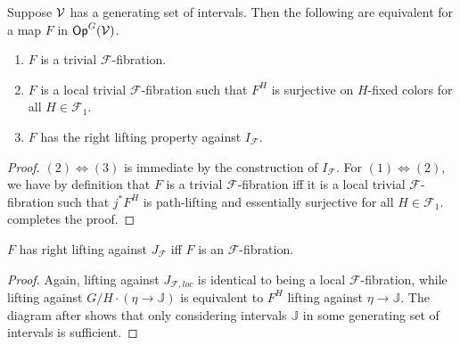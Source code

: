 \documentclass[a4paper,10pt
,draft
]{article}%
\renewcommand{\F}{\mathcal F}
\newcommand{\J}{\mathbb J}
\renewcommand{\1}{\eta}%
\begin{document}
\begin{lemma}
      \label{CAV_4.8}
      Suppose $\mathcal V$ has a generating set of intervals.
      Then the following are equivalent for a map $F$ in $\mathsf{Op}^G(\mathcal V)$.
      \begin{enumerate}[label = (\arabic*)]
      \item $F$ is a trivial $\F$-fibration.
      \item $F$ is a local trivial $\F$-fibration such that $F^H$ is surjective on $H$-fixed colors for all $H \in \F_1$.
      \item $F$ has the right lifting property against $I_{\F}$.
      \end{enumerate}
\end{lemma}
\begin{proof}
      $(2) \Leftrightarrow (3)$ is immediate by the construction of $I_{\F}$.
      For $(1) \Leftrightarrow (2)$, we have by definition that
      $F$ is a trivial $\F$-fibration
      iff
      it is a local trivial $\F$-fibration such that $j^*F^H$ is path-lifting and essentially surjective for all $H \in \F_1$.
      \cite[2.4]{BM13} completes the proof. 
\end{proof}

\begin{lemma}
      $F$ has right lifting against $J_{\F}$ iff $F$ is an $\F$-fibration.
\end{lemma}
\begin{proof}
      Again, lifting against $J_{\F, loc}$ is identical to being a local $\F$-fibration, while lifting against $G/H \cdot (\1 \to \J)$
      is equivalent to $F^H$ lifting against $\1 \to \J$.
      The diagram after \cite[(4.3.2)]{Cav} shows that only considering intervals $\J$ in some generating set of intervals is sufficient.
\end{proof}
\end{document}
